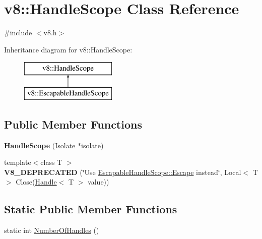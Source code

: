 \hypertarget{classv8_1_1_handle_scope}{}\section{v8\+:\+:Handle\+Scope Class Reference}
\label{classv8_1_1_handle_scope}


{\ttfamily \#include $<$v8.\+h$>$}

Inheritance diagram for v8\+:\+:Handle\+Scope\+:\begin{figure}[H]
\begin{center}
\leavevmode
\includegraphics[height=2.000000cm]{classv8_1_1_handle_scope}
\end{center}
\end{figure}
\subsection*{Public Member Functions}
\begin{DoxyCompactItemize}
\item 
\hypertarget{classv8_1_1_handle_scope_afdb3053d852ea467f026b025ed431e79}{}{\bfseries Handle\+Scope} (\hyperlink{classv8_1_1_isolate}{Isolate} $\ast$isolate)\label{classv8_1_1_handle_scope_afdb3053d852ea467f026b025ed431e79}

\item 
\hypertarget{classv8_1_1_handle_scope_a9997d1aaebedf8d252f8a47830efea89}{}{\footnotesize template$<$class T $>$ }\\{\bfseries V8\+\_\+\+D\+E\+P\+R\+E\+C\+A\+T\+E\+D} (\char`\"{}Use \hyperlink{classv8_1_1_escapable_handle_scope_afdf0d3850978f65d1a827f78b3a2b6fd}{Escapable\+Handle\+Scope\+::\+Escape} instead\char`\"{}, Local$<$ T $>$ Close(\hyperlink{classv8_1_1_handle}{Handle}$<$ T $>$ value))\label{classv8_1_1_handle_scope_a9997d1aaebedf8d252f8a47830efea89}

\end{DoxyCompactItemize}
\subsection*{Static Public Member Functions}
\begin{DoxyCompactItemize}
\item 
static int \hyperlink{classv8_1_1_handle_scope_abb2d32a75b0468885b7340404050604b}{Number\+Of\+Handles} ()
\end{DoxyCompactItemize}
